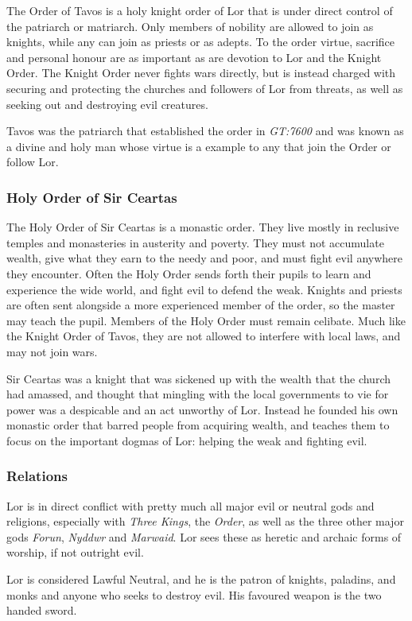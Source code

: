 The Order of Tavos is a holy knight order of Lor that is under direct control
of the patriarch or matriarch. Only members of nobility are allowed to join as
knights, while any can join as priests or as adepts. To the order virtue,
sacrifice and personal honour are as important as are devotion to Lor and the
Knight Order. The Knight Order never fights wars directly, but is instead
charged with securing and protecting the churches and followers of Lor from
threats, as well as seeking out and destroying evil creatures.

Tavos was the patriarch that established the order in \emph{GT:7600} and was
known as a divine and holy man whose virtue is a example to any that join
the Order or follow Lor.

\subsubsection*{Holy Order of Sir Ceartas}

The Holy Order of Sir Ceartas is a monastic order. They live mostly in
reclusive temples and monasteries in austerity and poverty. They must not
accumulate wealth, give what they earn to the needy and poor, and must fight
evil anywhere they encounter. Often the Holy Order sends forth their pupils to
learn and experience the wide world, and fight evil to defend the
weak. Knights and priests are often sent alongside a more experienced member
of the order, so the master may teach the pupil. Members of the Holy Order
must remain celibate. Much like the Knight Order of Tavos, they are not
allowed to interfere with local laws, and may not join wars.

Sir Ceartas was a knight that was sickened up with the wealth that the church
had amassed, and thought that mingling with the local governments to vie for
power was a despicable and an act unworthy of Lor. Instead he founded his own
monastic order that barred people from acquiring wealth, and teaches them to
focus on the important dogmas of Lor: helping the weak and fighting evil.

\subsubsection*{Relations}

Lor is in direct conflict with pretty much all major evil or neutral gods and
religions, especially with \emph{Three Kings}, the \emph{Order}, as well as
the three other major gods \emph{Forun}, \emph{Nyddwr} and \emph{Marwaid}. Lor
sees these as heretic and archaic forms of worship, if not outright evil.

\begin{35e}
  Lor is considered Lawful Neutral, and he is the patron of knights, paladins,
  and monks and anyone who seeks to destroy evil. His favoured weapon is the
  two handed sword.
\end{35e}
